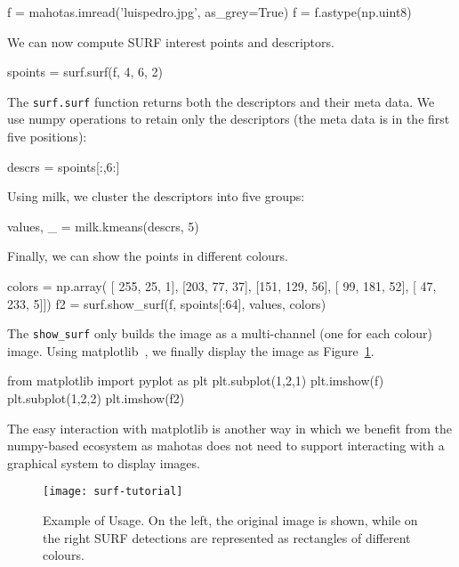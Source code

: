\documentclass{scrartcl}
\let\code\texttt
\begin{document}
\begin{python}
f = mahotas.imread('luispedro.jpg', as_grey=True)
f = f.astype(np.uint8)
\end{python}

We can now compute SURF interest points and descriptors.
\begin{python}
spoints = surf.surf(f, 4, 6, 2)
\end{python}

The \code{surf.surf} function returns both the descriptors and their meta data.
We use numpy operations to retain only the descriptors (the meta data is in the
first five positions):

\begin{python}
descrs = spoints[:,6:]
\end{python}

Using milk, we cluster the descriptors into five groups:

\begin{python}
values, _ = milk.kmeans(descrs, 5)
\end{python}

Finally, we can show the points in different colours.
\begin{python}
colors = np.array(
    [ 255,  25,   1],
    [203,  77,  37],
    [151, 129,  56],
    [ 99, 181,  52],
    [ 47, 233,   5]])
f2 = surf.show_surf(f, spoints[:64], values, colors)
\end{python}

The \texttt{show\_surf} only builds the image as a multi-channel (one for each
colour) image. Using matplotlib~\citep{10.1109/MCSE.2007.55}, we finally
display the image as Figure~\ref{fig:surf}.

\begin{python}
from matplotlib import pyplot as plt
plt.subplot(1,2,1)
plt.imshow(f)
plt.subplot(1,2,2)
plt.imshow(f2)
\end{python}

The easy interaction with matplotlib is another way in which we benefit from
the numpy-based ecosystem as mahotas does not need to support interacting with
a graphical system to display images.

\begin{figure}
\begin{center}
\texttt{[image: surf-tutorial]}
\end{center}
\caption{Example of Usage. On the left, the original image is shown, while on
the right SURF detections are represented as rectangles of different colours.}
\label{fig:surf}
\end{figure}
\end{document}
